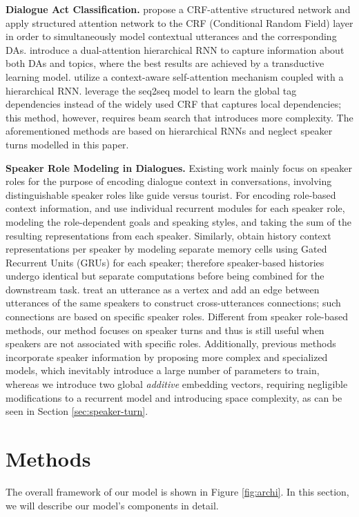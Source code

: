 \documentclass[11pt]{article}
\begin{document}
\textbf{Dialogue Act Classification.} 
\citet{chen2018dialogue} propose a CRF-attentive structured network and apply structured attention network to the CRF (Conditional Random Field) layer in order to simultaneously model contextual utterances and the corresponding DAs. 
\citet{li2018dual} introduce a dual-attention hierarchical RNN to capture information about both DAs and topics, where the best results are achieved by a transductive learning model. 
\citet{raheja2019dialogue} utilize a context-aware self-attention mechanism coupled with a hierarchical RNN. 
\citet{colombo2020guiding} leverage the seq2seq model to learn the global tag dependencies instead of the widely used CRF that captures local dependencies; this method, however, requires beam search that introduces more complexity.
The aforementioned methods are based on hierarchical RNNs and neglect speaker turns modelled in this paper.

\textbf{Speaker Role Modeling in Dialogues.} 
Existing work mainly focus on speaker roles for the purpose of encoding dialogue context in conversations, involving distinguishable speaker roles like guide versus tourist.
For encoding role-based context information, \citet{chi2017speaker} and \citet{chen2017dynamic} use individual recurrent modules for each speaker role, modeling the role-dependent goals and speaking styles, and taking the sum of the resulting representations from each speaker. Similarly, \citet{hazarika2018conversational} obtain history context representations per speaker by modeling separate memory cells using Gated Recurrent Units (GRUs) for each speaker; therefore speaker-based histories undergo identical but separate computations before being combined for the downstream task.
\citet{qin2021co} treat an utterance as a vertex and add an edge between utterances of the same speakers to construct cross-utterances connections; such connections are based on specific speaker roles.
Different from speaker role-based methods, our method focuses on speaker turns and thus is still useful when speakers are not associated with specific roles. Additionally, previous methods incorporate speaker information by proposing more complex and specialized models, which inevitably introduce a large number of parameters to train, whereas we introduce two global \emph{additive} embedding vectors, requiring negligible modifications to a recurrent model and introducing  space complexity, as can be seen in Section \ref{sec:speaker-turn}.

\section{Methods}
The overall framework of our model is shown in Figure \ref{fig:archi}.  In this section, we will describe our model's components in detail.
\end{document}
